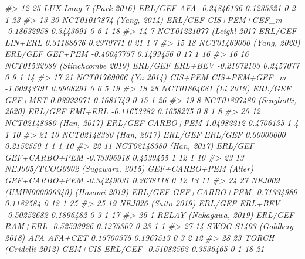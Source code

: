 \documentclass[
]{article}
\newenvironment{Shaded}{\begin{snugshade}}{\end{snugshade}}
\newcommand{\CommentTok}[1]{\textcolor[rgb]{0.56,0.35,0.01}{\textit{#1}}}
\begin{document}
\begin{Shaded}
\begin{Highlighting}[]
\CommentTok{\#\textgreater{} 12 25                LUX{-}Lung 7 (Park 2016)               ERL/GEF           AFA {-}0.24846136 0.1235321         0   2     1     23}
\CommentTok{\#\textgreater{} 13 20              NCT01017874 (Yang, 2014)               ERL/GEF CIS+PEM+GEF\_m {-}0.18632958 0.3443691         0   6     1     18}
\CommentTok{\#\textgreater{} 14  7              NCT01221077 (Leighl 2017               ERL/GEF       LIN+ERL  0.31188676 0.2970771         0  21     1      7}
\CommentTok{\#\textgreater{} 15 18              NCT01469000 (Yang, 2020)               ERL/GEF       GEF+PEM {-}0.40047757 0.1499456         0  17     1     16}
\CommentTok{\#\textgreater{} 16 16        NCT01532089 (Stinchcombe 2019)               ERL/GEF       ERL+BEV {-}0.21072103 0.2457077         0   9     1     14}
\CommentTok{\#\textgreater{} 17 21                 NCT01769066 (Yu 2014)               CIS+PEM CIS+PEM+GEF\_m {-}1.60943791 0.6908291         0   6     5     19}
\CommentTok{\#\textgreater{} 18 28                 NCT01864681 (Li 2019)               ERL/GEF       GEF+MET  0.03922071 0.1681749         0  15     1     26}
\CommentTok{\#\textgreater{} 19  8        NCT01897480 (Scagliotti, 2020)               ERL/GEF       EMI+ERL {-}0.11653382 0.1658275         0   8     1      8}
\CommentTok{\#\textgreater{} 20 12               NCT02148380 (Han, 2017)               ERL/GEF     CARBO+PEM  1.04982212 0.4706135         1   4     1     10}
\CommentTok{\#\textgreater{} 21 10               NCT02148380 (Han, 2017)               ERL/GEF       ERL/GEF  0.00000000 0.2152550         1   1     1     10}
\CommentTok{\#\textgreater{} 22 11               NCT02148380 (Han, 2017)               ERL/GEF GEF+CARBO+PEM {-}0.73396918 0.4539455         1  12     1     10}
\CommentTok{\#\textgreater{} 23 13      NEJ005/TCOG0902 (Sugawara, 2015) GEF+CARBO+PEM (Alter) GEF+CARBO+PEM {-}0.34249031 0.2678118         0  12    13     11}
\CommentTok{\#\textgreater{} 24 27  NEJ009 (UMIN000006340) (Hosomi 2019)               ERL/GEF GEF+CARBO+PEM {-}0.71334989 0.1182584         0  12     1     25}
\CommentTok{\#\textgreater{} 25 19                   NEJ026 (Saito 2019)               ERL/GEF       ERL+BEV {-}0.50252682 0.1896482         0   9     1     17}
\CommentTok{\#\textgreater{} 26  1                RELAY (Nakagawa, 2019)               ERL/GEF       RAM+ERL {-}0.52593926 0.1275307         0  23     1      1}
\CommentTok{\#\textgreater{} 27 14            SWOG S1403 (Goldberg 2018)                   AFA       AFA+CET  0.15700375 0.1967513         0   3     2     12}
\CommentTok{\#\textgreater{} 28 23                 TORCH (Gridelli 2012)               GEM+CIS       ERL/GEF {-}0.51082562 0.3536465         0   1    18     21}

\end{Highlighting}
\end{Shaded}
\end{document}
